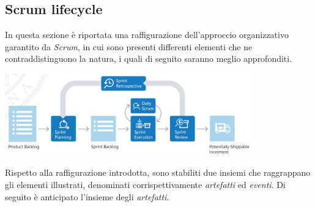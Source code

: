 \documentclass{article}
\begin{document}
\subsection*{Scrum lifecycle}
\large
In questa sezione è riportata una raffigurazione dell'approccio organizzativo garantito da \textit{Scrum}, in cui sono presenti differenti elementi che ne contraddistinguono la natura, i quali di seguito saranno meglio approfonditi.
\begin{center}
    \includegraphics[width=0.8\textwidth]{foto 1.png}
\end{center}
Rispetto alla raffigurazione introdotta, sono stabiliti due insiemi che raggrappano gli elementi illustrati, denominati corrispettivamente \textit{artefatti} ed \textit{eventi}. Di seguito è anticipato l'insieme degli \textit{artefatti}.
\end{document}
